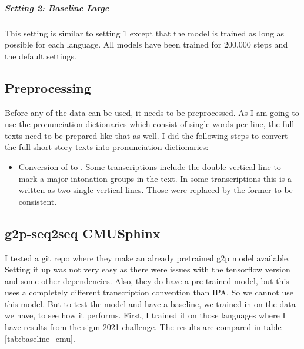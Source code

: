 \subparagraph{Setting 2: Baseline Large}
This setting is similar to setting 1 except that the model is trained as long as possible for each language. All models have been trained for 200,000 steps and the default settings. 

\subsection{Preprocessing}
Before any of the data can be used, it needs to be preprocessed. As I am going to use the pronunciation dictionaries which consist of single words per line, the full texts need to be prepared like that as well. I did the following steps to convert the full short story texts into pronunciation dictionaries:

\begin{itemize}
\item Conversion of \textipa{\textvertline   \textvertline} to \textipa{\textdoublevertline}. Some transcriptions include the double vertical line to mark a major intonation groups in the text. In some transcriptions this is a written as two single vertical lines. Those were replaced by the former to be consistent. 
\end{itemize}

\subsection{g2p-seq2seq CMUSphinx}
I tested a git repo where they make an already pretrained \ac{g2p} model available. Setting it up was not very easy as there were issues with the tensorflow version and some other dependencies. Also, they do have a pre-trained model, but this uses a completely different transcription convention than IPA. So we cannot use this model. But to test the model and have a baseline, we trained in on the data we have, to see how it performs. First, I trained it on those languages where I have results from the \ac{sigm} 2021 challenge. The results are compared in table \ref{tab:baseline_cmu}. 

